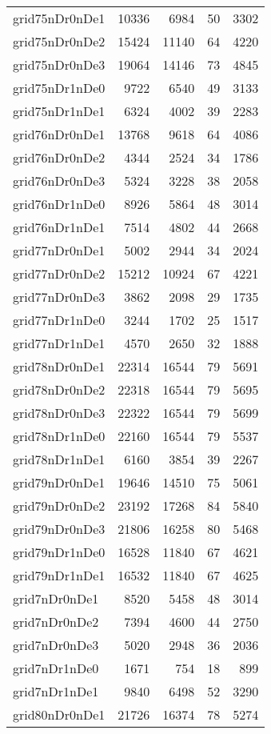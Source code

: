 \begin{tabular}{lrrrr}
grid75nDr0nDe1 & 10336 & 6984 & 50 & 3302 \\
grid75nDr0nDe2 & 15424 & 11140 & 64 & 4220 \\
grid75nDr0nDe3 & 19064 & 14146 & 73 & 4845 \\
grid75nDr1nDe0 & 9722 & 6540 & 49 & 3133 \\
grid75nDr1nDe1 & 6324 & 4002 & 39 & 2283 \\
grid76nDr0nDe1 & 13768 & 9618 & 64 & 4086 \\
grid76nDr0nDe2 & 4344 & 2524 & 34 & 1786 \\
grid76nDr0nDe3 & 5324 & 3228 & 38 & 2058 \\
grid76nDr1nDe0 & 8926 & 5864 & 48 & 3014 \\
grid76nDr1nDe1 & 7514 & 4802 & 44 & 2668 \\
grid77nDr0nDe1 & 5002 & 2944 & 34 & 2024 \\
grid77nDr0nDe2 & 15212 & 10924 & 67 & 4221 \\
grid77nDr0nDe3 & 3862 & 2098 & 29 & 1735 \\
grid77nDr1nDe0 & 3244 & 1702 & 25 & 1517 \\
grid77nDr1nDe1 & 4570 & 2650 & 32 & 1888 \\
grid78nDr0nDe1 & 22314 & 16544 & 79 & 5691 \\
grid78nDr0nDe2 & 22318 & 16544 & 79 & 5695 \\
grid78nDr0nDe3 & 22322 & 16544 & 79 & 5699 \\
grid78nDr1nDe0 & 22160 & 16544 & 79 & 5537 \\
grid78nDr1nDe1 & 6160 & 3854 & 39 & 2267 \\
grid79nDr0nDe1 & 19646 & 14510 & 75 & 5061 \\
grid79nDr0nDe2 & 23192 & 17268 & 84 & 5840 \\
grid79nDr0nDe3 & 21806 & 16258 & 80 & 5468 \\
grid79nDr1nDe0 & 16528 & 11840 & 67 & 4621 \\
grid79nDr1nDe1 & 16532 & 11840 & 67 & 4625 \\
grid7nDr0nDe1 & 8520 & 5458 & 48 & 3014 \\
grid7nDr0nDe2 & 7394 & 4600 & 44 & 2750 \\
grid7nDr0nDe3 & 5020 & 2948 & 36 & 2036 \\
grid7nDr1nDe0 & 1671 & 754 & 18 & 899 \\
grid7nDr1nDe1 & 9840 & 6498 & 52 & 3290 \\
grid80nDr0nDe1 & 21726 & 16374 & 78 & 5274 \\

\end{tabular}
